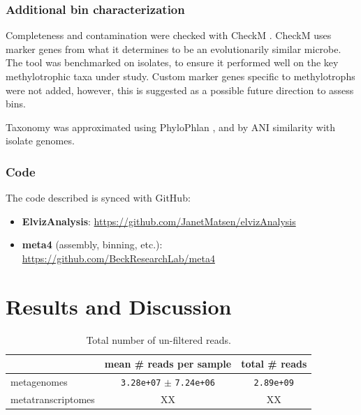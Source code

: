 \subsubsection{Additional bin characterization}

Completeness and contamination were checked with CheckM \cite{parks2015}.
CheckM uses marker genes from what it determines to be an evolutionarily similar microbe.
The tool was benchmarked on isolates, to ensure it performed well on the key methylotrophic taxa under study.
Custom marker genes specific to methylotrophs were not added, however, this is suggested as a possible future direction to assess bins.

Taxonomy was approximated using PhyloPhlan \cite{segata2013}, and by ANI similarity with isolate genomes.

\subsubsection{Code}
The code described is synced with GitHub:
\begin{itemize}
    \item \textbf{ElvizAnalysis}: \url{https://github.com/JanetMatsen/elvizAnalysis}
    \item \textbf{meta4} (assembly, binning, etc.): \url{https://github.com/BeckResearchLab/meta4}
\end{itemize}

\section{Results and Discussion}


\begin{table}[H]
\centering
\begin{tabular}{l | cc}
        & mean \# reads per sample & total \# reads \\
\midrule
	metagenomes & \texttt{3.28e+07} $\pm$ \texttt{7.24e+06} & \texttt{2.89e+09} \\ %
	metatranscriptomes & XX & XX \\
\end{tabular}
\caption{Total number of un-filtered reads.}
\label{table:sample_read_sizes}
\end{table}

